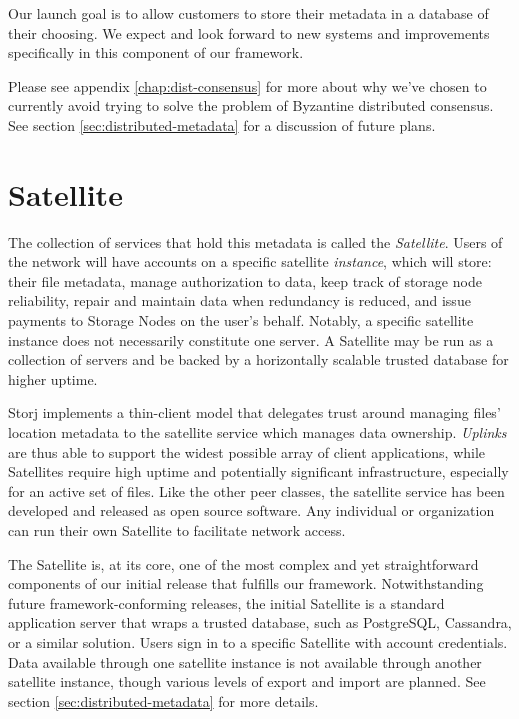 \documentclass[8pt,fleqn,openany]{book}
\begin{document}
Our launch goal is to allow customers to store their metadata in a database of
their choosing. We expect and look forward to new systems and improvements
specifically in this component of our framework.

Please see appendix \ref{chap:dist-consensus} for more about why we've chosen
to currently avoid trying to solve the problem of Byzantine distributed consensus.
See section \ref{sec:distributed-metadata} for a discussion of future plans.

\section{Satellite}

The collection of services that hold this metadata is called the
{\em Satellite}. Users of the network will have accounts on a specific
satellite {\em instance}, which will store: their file metadata, manage authorization
to data, keep track of storage node reliability, repair and maintain data when
redundancy is reduced, and issue payments to Storage Nodes on the user's behalf.
Notably, a specific satellite instance does not necessarily constitute one
server. A Satellite may be run as a collection of servers and be backed by
a horizontally scalable trusted database for higher uptime.

Storj implements a thin-client model that delegates trust around managing
files' location metadata to the satellite service which manages data
ownership. {\em Uplinks}
are thus able to support the widest possible array of client applications, while
Satellites require high uptime and potentially significant infrastructure,
especially for an active set of files.
Like the other peer classes,
the satellite service has been developed and released as open source software.
Any individual or organization can run their own Satellite to facilitate
network access.

The Satellite is, at its core, one of the most complex and yet
straightforward components of our initial release that fulfills our framework.
Notwithstanding future framework-conforming releases, the initial Satellite
is a standard application server that wraps a trusted database, such as
PostgreSQL, Cassandra, or a similar solution. Users sign in to a specific
Satellite with account credentials.
Data available through one satellite instance is
not available through another satellite instance, though various levels of
export and import are planned. See section \ref{sec:distributed-metadata}
for more details.
\end{document}

